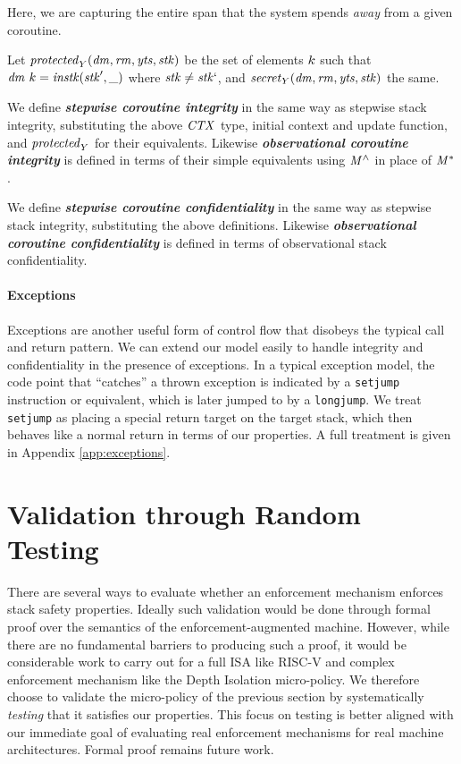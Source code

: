 \documentclass[10pt,conference]{ieeetran}%
\theoremstyle{definition}
\begin{document}
{\noindent
Here, we are capturing the entire span that the system spends {\em away} from a given
coroutine.

Let \(\mathit{protected}_Y(\mathit{dm},\mathit{rm},\mathit{yts},\mathit{stk})\) be the set of elements \(k\) such that
\(\mathit{dm} ~ k = \mathit{instk}(\mathit{stk}',\relax{\_})\) where \(\mathit{stk} \not = \mathit{stk}`\),
and \(\mathit{secret}_Y(\mathit{dm},\mathit{rm},\mathit{yts},\mathit{stk})\) the same.

We define \textbf{\em stepwise coroutine integrity} in the same way as stepwise stack integrity,
substituting the above \(\mathit{CTX}\) type, initial context and update
function, and \(\mathit{protected}_Y\) for their equivalents. Likewise
\textbf{\em observational coroutine integrity} is defined
in terms of their simple equivalents using \(\mathit{M}^\wedge\) in place of \(\mathit{M}^*\).

We define \textbf{\em stepwise coroutine confidentiality} in the same way as stepwise stack
integrity, substituting the above definitions. Likewise
\textbf{\em observational coroutine confidentiality} is defined in terms of observational
stack confidentiality.

\medskip

\paragraph*{Exceptions}

Exceptions are another useful form of control flow that disobeys the typical call and return pattern.
We can extend our model easily to handle integrity and confidentiality in the presence of exceptions.
In a typical exception model, the code point that ``catches'' a thrown exception is indicated by a {\tt setjump}
instruction or equivalent, which is later jumped to by a {\tt longjump}. We treat {\tt setjump} as placing
a special return target on the target stack, which then behaves like a normal return in terms of our properties.
A full treatment is given in Appendix \ref{app:exceptions}.

\section{Validation through Random Testing}
\label{sec:testing}

There are several ways to evaluate whether an enforcement mechanism enforces
stack safety properties. Ideally such validation would be done through formal proof over
the semantics of the enforcement-augmented machine.
However, while there are no fundamental barriers to producing such a proof,
it would be considerable work to carry out for a full ISA like RISC-V and
complex enforcement mechanism like the Depth Isolation micro-policy.
We therefore choose to validate the micro-policy of the previous section by
systematically \emph{testing} that it satisfies our properties.
This focus on testing is better aligned with our immediate
goal of evaluating real enforcement mechanisms for real machine architectures.
Formal proof remains future work.

}
\end{document}
